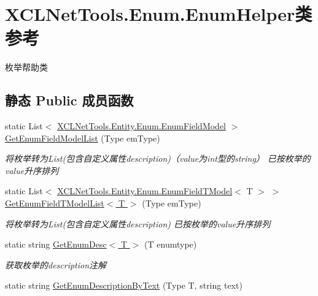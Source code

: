 \hypertarget{class_x_c_l_net_tools_1_1_enum_1_1_enum_helper}{}\section{X\+C\+L\+Net\+Tools.\+Enum.\+Enum\+Helper类 参考}
\label{class_x_c_l_net_tools_1_1_enum_1_1_enum_helper}


枚举帮助类  


\subsection*{静态 Public 成员函数}
\begin{DoxyCompactItemize}
\item 
static List$<$ \hyperlink{class_x_c_l_net_tools_1_1_entity_1_1_enum_1_1_enum_field_model}{X\+C\+L\+Net\+Tools.\+Entity.\+Enum.\+Enum\+Field\+Model} $>$ \hyperlink{class_x_c_l_net_tools_1_1_enum_1_1_enum_helper_acdcc3f9200705cc0831c1395f5d2c51e}{Get\+Enum\+Field\+Model\+List} (Type em\+Type)
\begin{DoxyCompactList}\small\item\em 将枚举转为\+List(包含自定义属性description)（value为int型的string） 已按枚举的value升序排列 \end{DoxyCompactList}\item 
static List$<$ \hyperlink{class_x_c_l_net_tools_1_1_entity_1_1_enum_1_1_enum_field_t_model}{X\+C\+L\+Net\+Tools.\+Entity.\+Enum.\+Enum\+Field\+T\+Model}$<$ T $>$ $>$ \hyperlink{class_x_c_l_net_tools_1_1_enum_1_1_enum_helper_a919aa80b589b8038b8db6f731b50556d}{Get\+Enum\+Field\+T\+Model\+List$<$ T $>$} (Type em\+Type)
\begin{DoxyCompactList}\small\item\em 将枚举转为\+List(包含自定义属性description) 已按枚举的value升序排列 \end{DoxyCompactList}\item 
static string \hyperlink{class_x_c_l_net_tools_1_1_enum_1_1_enum_helper_a3445493f9dd4798778af8ecfb2062b1b}{Get\+Enum\+Desc$<$ T $>$} (T enumtype)
\begin{DoxyCompactList}\small\item\em 获取枚举的description注解 \end{DoxyCompactList}\item 
static string \hyperlink{class_x_c_l_net_tools_1_1_enum_1_1_enum_helper_ac1c67f6247644347ed4673965832feaf}{Get\+Enum\+Description\+By\+Text} (Type T, string text)

\end{DoxyCompactItemize}
